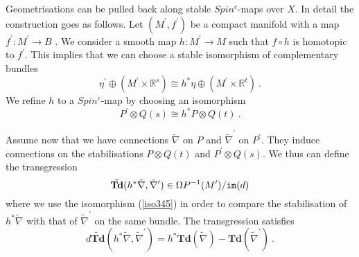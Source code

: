 \documentclass[12pt]{article}
\newcommand{\im}{{\tt im}}
\newcommand{\R}{{\mathbb{R}}}
\newcommand{\Td}{{\mathbf{Td}}}
\begin{document}
Geometrisations can be pulled back along stable $Spin^{c}$-maps over $X$.  In detail the construction goes as follows.
Let $(M^{\prime},f^{\prime} )$ be a compact manifold with a map  $f^{\prime}:M^{\prime}\to B$ . We consider a smooth map $h:M^{\prime}\to M$  such that $f\circ h$ is homotopic to $f^{\prime}$. This implies that we can choose a stable isomorphism of complementary bundles
\begin{equation} \label{iso345q}\eta^{\prime}\oplus (M^{\prime}\times \R^{s})\cong h^{*}\eta\oplus (M^{\prime}\times \R^{t})\ .\end{equation} We refine $h$ to a $Spin^{c}$-map  
  by choosing an isomorphism
\begin{equation} \label{iso345}  P^{\prime}\otimes Q(s)\cong h^{*}P\otimes Q(t)\ .\end{equation}

Assume now that we have connections $\tilde \nabla$ on $P$ and $\tilde \nabla^{\prime}$ on $P^{\prime}$. They induce connections on the stabilisations   $P\otimes Q(t)$ and  $ P^{\prime}\otimes Q(s)$.   We thus can define the transgression
 $$\tilde  \Td(h^{*}\tilde \nabla,\tilde \nabla^{\prime})\in \Omega P^{-1}(M^{\prime})/\im(d)$$
 where we use the isomorphism (\ref{iso345}) in order to compare the stabilisation of  $h^{*}\tilde \nabla$ with that of $\tilde \nabla^{\prime}$ on the same bundle. 
 The transgression satisfies
 $$d\tilde  \Td(h^{*}\tilde \nabla,\tilde \nabla^{\prime}) =h^{*}\Td(\tilde \nabla)-\Td(\tilde \nabla^{\prime})\ .$$
  
\end{document}
